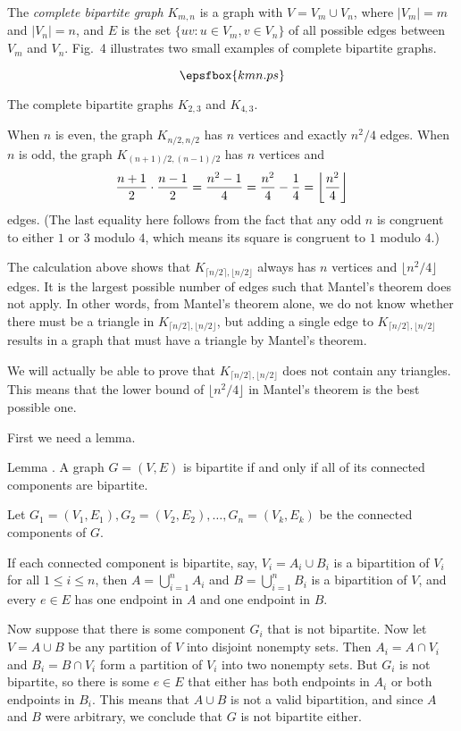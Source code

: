 The {\it complete bipartite graph} $K_{m,n}$ is a graph with $V = V_m \cup V_n$, where
$|V_m|=m$ and $|V_n| = n$, and $E$ is the set $\{uv : u\in V_m, v\in V_n\}$ of
all possible edges between $V_m$ and $V_n$. Fig.~4 illustrates two small examples
of complete bipartite graphs.

\midinsert
$$\epsfbox{kmn.ps}$$
\vskip5pt
\caption{The complete bipartite graphs $K_{2,3}$ and $K_{4,3}$.}
\endinsert
\goodbreak
When $n$ is even, the graph $K_{n/2,n/2}$ has $n$ vertices and exactly $n^2/4$ edges.
When $n$ is odd, the graph $K_{(n+1)/2, (n-1)/2}$ has $n$ vertices and
$$ {n+1\over 2} \cdot {n-1\over 2} = {n^2-1\over 4} = {n^2\over 4}-{1\over 4}
= \biggl\lfloor {n^2\over 4} \biggr\rfloor$$
edges. (The last equality here follows from the fact that any odd $n$ is congruent to either $1$ or
$3$ modulo $4$, which means its square is congruent to $1$ modulo $4$.)

The calculation above shows that $K_{\lceil n/2 \rceil, \lfloor n/2 \rfloor}$
always has $n$ vertices and $\lfloor n^2/4\rfloor$ edges. It is the largest possible number
of edges such that Mantel's theorem does not apply. In other words, from Mantel's theorem alone,
we do not know whether
there must be a triangle in $K_{\lceil n/2 \rceil, \lfloor n/2 \rfloor}$, but adding
a single edge to $K_{\lceil n/2 \rceil, \lfloor n/2 \rfloor}$ results in a graph that must
have a triangle by Mantel's theorem.

We will actually be able to prove that $K_{\lceil n/2 \rceil, \lfloor n/2 \rfloor}$ does not
contain any triangles. This means that the lower bound of $\lfloor n^2/4\rfloor$ in Mantel's theorem
is the best possible one.

First we need a lemma.

\proclaim{} Lemma \advthm.
A graph $G=(V,E)$ is bipartite if and only if all of its connected components
are bipartite.

\proof Let $G_1 = (V_1, E_1), G_2 = (V_2,E_2),\ldots, G_n = (V_k, E_k)$ be the
connected components of $G$.

If each connected component is bipartite, say,
$V_i = A_i\cup B_i$ is a bipartition of $V_i$ for all $1\le i\le n$, then
$A = \bigcup_{i=1}^n A_i$ and $B = \bigcup_{i=1}^n B_i$ is a bipartition of $V$,
and every $e\in E$ has one endpoint in $A$ and one endpoint in $B$.

Now suppose that there is some component $G_i$ that is not bipartite.
Now let $V = A\cup B$
be any partition of $V$ into disjoint nonempty sets. Then $A_i = A\cap V_i$
and $B_i = B\cap V_i$ form a partition of $V_i$
into two nonempty sets. But $G_i$ is not bipartite, so there is some $e\in E$
that either has both endpoints in $A_i$ or both endpoints in $B_i$. This means
that $A\cup B$ is not a valid bipartition, and since $A$ and $B$ were arbitrary,
we conclude that
$G$ is not bipartite either.\slug

